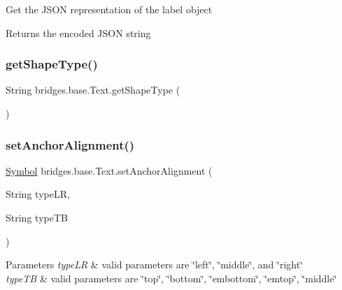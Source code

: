 Get the J\+S\+ON representation of the label object

\begin{DoxyReturn}{Returns}
the encoded J\+S\+ON string 
\end{DoxyReturn}
\mbox{\label{classbridges_1_1base_1_1_text_ac4ddf14ec9b6265da4eceaaf5ec42f85}} 
\subsubsection{\texorpdfstring{get\+Shape\+Type()}{getShapeType()}}
{\footnotesize\ttfamily String bridges.\+base.\+Text.\+get\+Shape\+Type (\begin{DoxyParamCaption}{ }\end{DoxyParamCaption})}

\mbox{\label{classbridges_1_1base_1_1_text_a26aea94a119885a8127bac8345a9fe52}} 
\subsubsection{\texorpdfstring{set\+Anchor\+Alignment()}{setAnchorAlignment()}}
{\footnotesize\ttfamily \hyperlink{classbridges_1_1base_1_1_symbol}{Symbol} bridges.\+base.\+Text.\+set\+Anchor\+Alignment (\begin{DoxyParamCaption}\item[{String}]{type\+LR,  }\item[{String}]{type\+TB }\end{DoxyParamCaption})}


\begin{DoxyParams}{Parameters}
{\em type\+LR} & valid parameters are \char`\"{}left\char`\"{}, \char`\"{}middle\char`\"{}, and \char`\"{}right\char`\"{} \\
\hline
{\em type\+TB} & valid parameters are \char`\"{}top\char`\"{}, \char`\"{}bottom\char`\"{}, \char`\"{}embottom\char`\"{}, \char`\"{}emtop\char`\"{}, \char`\"{}middle\char`\"{} \\
\hline
\end{DoxyParams}
\mbox{\label{classbridges_1_1base_1_1_text_ad878ddc8b965f77ed279019822ba7ba1}} 
